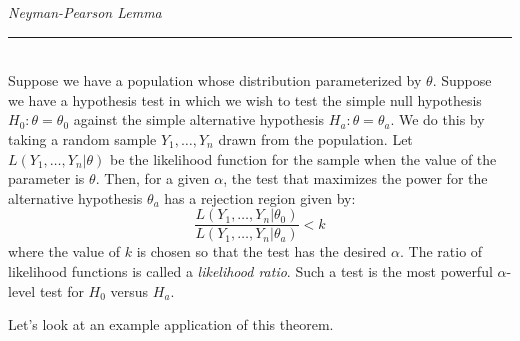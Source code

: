 \documentclass[12pt]{article}
\theoremstyle{definition}
\theoremstyle{remark}
\begin{document}
\begin{framed}
\emph{Neyman-Pearson Lemma}\\
  \rule{\dimexpr{}\fboxrule}{.1pt} \\
Suppose we have a population whose distribution parameterized by $\theta$. Suppose we have a hypothesis test in which we wish to test the simple null hypothesis $H_0: \theta = \theta_0$ against the simple alternative hypothesis $H_a: \theta = \theta_a$. We do this by taking a random sample $Y_1, \dots, Y_n$ drawn from the population. Let $L(Y_1, \dots, Y_n|\theta)$ be the likelihood function for the sample when the value of the parameter is $\theta$. Then, for a given $\alpha$, the test that maximizes the power for the alternative hypothesis $\theta_a$ has a rejection region given by:
\[
\frac{ L(Y_1, \dots, Y_n|\theta_0) }{ L(Y_1, \dots, Y_n|\theta_a)} < k
\]
where the value of $k$ is chosen so that the test has the desired $\alpha$. The ratio of likelihood functions is called a \emph{likelihood ratio}. Such a test is the most powerful $\alpha$-level test for $H_0$ versus $H_a$.
\end{framed}

Let's look at an example application of this theorem.
\end{document}
